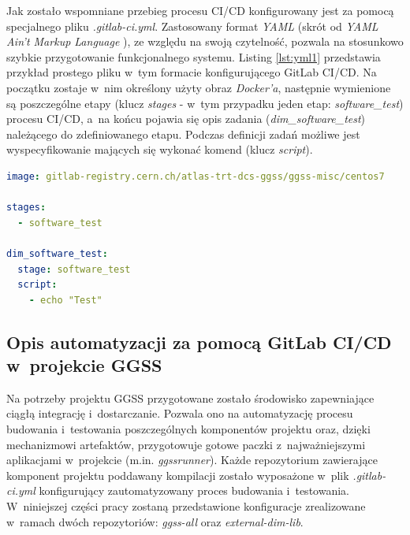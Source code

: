 Jak zostało wspomniane przebieg procesu CI/CD konfigurowany jest za pomocą specjalnego pliku \textit{.gitlab-ci.yml}. Zastosowany format \textit{YAML} (skrót od \textit{YAML Ain't Markup Language} \cite{YAMLWiki}), ze względu na swoją czytelność, pozwala na stosunkowo szybkie przygotowanie funkcjonalnego systemu. Listing \ref{lst:yml1} przedstawia przykład prostego pliku w~tym formacie konfigurującego GitLab CI/CD. Na początku zostaje w~nim określony użyty obraz \textit{Docker'a}, następnie wymienione są poszczególne etapy (klucz \textit{stages} - w~tym przypadku jeden etap: \textit{software\_test}) procesu CI/CD, a~na końcu pojawia się opis zadania (\textit{dim\_software\_test}) należącego do zdefiniowanego etapu. Podczas definicji zadań możliwe jest wyspecyfikowanie mających się wykonać komend (klucz \textit{script}).

\begin{lstlisting}[language=yaml, caption={Przykład prostego pliku \textit{.gitlab-ci.yml} generującego jeden etap procesu CI/CD oraz jedno zadanie w~ramach tego etapu}, label={lst:yml1}]
image: gitlab-registry.cern.ch/atlas-trt-dcs-ggss/ggss-misc/centos7

stages:
  - software_test

dim_software_test:
  stage: software_test
  script:
    - echo "Test"

\end{lstlisting}

\subsection{Opis automatyzacji za pomocą GitLab CI/CD w~projekcie GGSS}
Na potrzeby projektu GGSS przygotowane zostało środowisko zapewniające ciągłą integrację i~dostarczanie. Pozwala ono na automatyzację procesu budowania i~testowania poszczególnych komponentów projektu oraz, dzięki mechanizmowi artefaktów, przygotowuje gotowe paczki z~najważniejszymi aplikacjami w~projekcie (m.in. \textit{ggssrunner}). Każde repozytorium zawierające komponent projektu poddawany kompilacji zostało wyposażone w~plik \textit{.gitlab-ci.yml} konfigurujący zautomatyzowany proces budowania i~testowania. W~niniejszej części pracy zostaną przedstawione konfiguracje zrealizowane w~ramach dwóch repozytoriów: \textit{ggss-all} oraz \textit{external-dim-lib}. 

